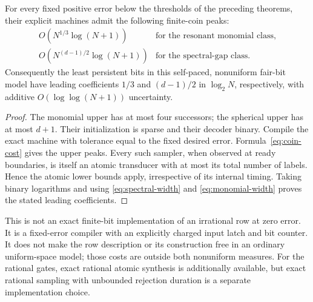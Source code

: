\begin{corollary}\label{cor:coin-rate}
For every fixed positive error below the thresholds of the preceding
theorems, their explicit machines admit the following finite-coin peaks:
\[
 \begin{array}{ll}
 O(N^{1/3}\log(N+1)) &\text{for the resonant monomial class},\\
 O(N^{(d-1)/2}\log(N+1)) &\text{for the spectral-gap class}.
 \end{array}
\]
Consequently the least persistent bits in this self-paced, nonuniform
fair-bit model have leading coefficients $1/3$ and $(d-1)/2$ in
$\log_2 N$, respectively, with additive $O(\log\log(N+1))$ uncertainty.
\end{corollary}
\begin{proof}
The monomial upper has at most four successors; the spherical upper has
at most $d+1$. Their initialization is sparse and their decoder binary.
Compile the exact machine with tolerance equal to the fixed desired
error. Formula~\eqref{eq:coin-cost} gives the upper peaks.
Every such sampler, when observed at ready boundaries, is itself an
atomic transducer with at most its total number of labels. Hence the
atomic lower bounds apply, irrespective of its internal timing. Taking
binary logarithms and using \eqref{eq:spectral-width} and
\eqref{eq:monomial-width} proves the stated leading coefficients.
\end{proof}

This is not an exact finite-bit implementation of an irrational row at
zero error. It is a fixed-error compiler with an explicitly charged input
latch and bit counter. It does not make the row description or its
construction free in an ordinary uniform-space model; those costs are
outside both nonuniform measures. For the rational gates, exact rational
atomic synthesis is additionally available, but exact rational sampling
with unbounded rejection duration is a separate implementation choice.
